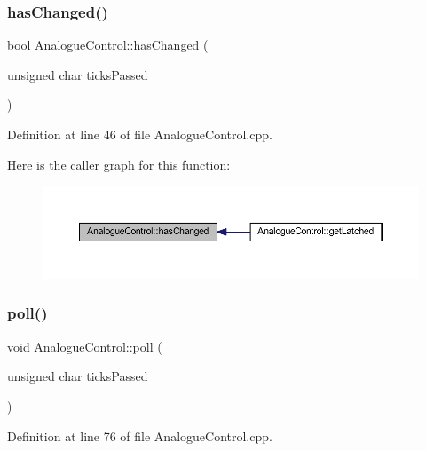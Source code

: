 \subsubsection{\texorpdfstring{has\+Changed()}{hasChanged()}}
{\footnotesize\ttfamily bool Analogue\+Control\+::has\+Changed (\begin{DoxyParamCaption}\item[{unsigned char}]{ticks\+Passed }\end{DoxyParamCaption})}



Definition at line 46 of file Analogue\+Control.\+cpp.

Here is the caller graph for this function\+:
\nopagebreak
\begin{figure}[H]
\begin{center}
\leavevmode
\includegraphics[width=350pt]{class_analogue_control_ab670265f948d7416bcf07c91dcf97bce_icgraph}
\end{center}
\end{figure}
\mbox{\label{class_analogue_control_a5ec0b55a6abd8c73e61f86f2322251a5}} 
\subsubsection{\texorpdfstring{poll()}{poll()}}
{\footnotesize\ttfamily void Analogue\+Control\+::poll (\begin{DoxyParamCaption}\item[{unsigned char}]{ticks\+Passed }\end{DoxyParamCaption})}



Definition at line 76 of file Analogue\+Control.\+cpp.

